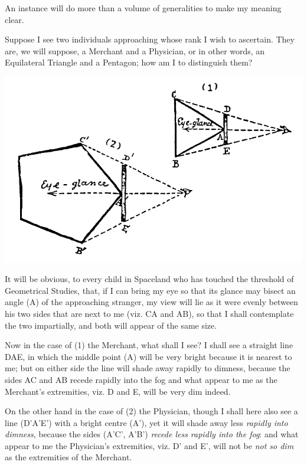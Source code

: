 \documentclass[10pt, kindle, oneside]{kindle}
\begin{document}
An instance will do more than a volume of generalities to make my meaning
clear.

Suppose I see two individuals approaching whose rank I wish to ascertain. They
are, we will suppose, a Merchant and a Physician, or in other words, an
Equilateral Triangle and a Pentagon; how am I to distinguish them?

\includegraphics[trim=0mm 0mm 0mm 0mm, width=\linewidth]{fig3}

It will be obvious, to every child in Spaceland who has touched the threshold
of Geometrical Studies, that, if I can bring my eye so that its glance may
bisect an angle (A) of the approaching stranger, my view will lie as it were
evenly between his two sides that are next to me (viz. CA and AB), so that I
shall contemplate the two impartially, and both will appear of the same size.

Now in the case of (1) the Merchant, what shall I see? I shall see a straight
line DAE, in which the middle point (A) will be very bright because it is
nearest to me; but on either side the line will shade away rapidly to dimness,
because the sides AC and AB recede rapidly into the fog and what appear to me
as the Merchant's extremities, viz. D and E, will be very dim indeed.

On the other hand in the case of (2) the Physician, though I shall here also
see a line (D'A'E') with a bright centre (A'), yet it will shade away less
\emph{rapidly into dimness}, because the sides (A'C', A'B') \emph{recede less rapidly into
the fog}: and what appear to me the Physician's extremities, viz. D' and E',
will not be \emph{not so dim} as the extremities of the Merchant.
\end{document}
